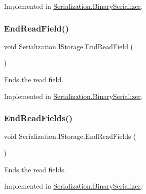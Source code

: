Implemented in \hyperlink{class_serialization_1_1_binary_serializer_a37b4e1255ab937e041a3c8d0786b461c}{Serialization.\+Binary\+Serializer}.

\mbox{\label{interface_serialization_1_1_i_storage_ad27a910b48b01fcee850465606cd2a6f}} 
\subsubsection{\texorpdfstring{End\+Read\+Field()}{EndReadField()}}
{\footnotesize\ttfamily void Serialization.\+I\+Storage.\+End\+Read\+Field (\begin{DoxyParamCaption}{ }\end{DoxyParamCaption})}



Ends the read field. 



Implemented in \hyperlink{class_serialization_1_1_binary_serializer_a0c52bbac20e29e59f6c48868d4729928}{Serialization.\+Binary\+Serializer}.

\mbox{\label{interface_serialization_1_1_i_storage_af38f83f1eb0c5190fd0e4ad845ff0649}} 
\subsubsection{\texorpdfstring{End\+Read\+Fields()}{EndReadFields()}}
{\footnotesize\ttfamily void Serialization.\+I\+Storage.\+End\+Read\+Fields (\begin{DoxyParamCaption}{ }\end{DoxyParamCaption})}



Ends the read fields. 



Implemented in \hyperlink{class_serialization_1_1_binary_serializer_a5083f578f8a2aff5fd5163edc802a0d1}{Serialization.\+Binary\+Serializer}.

\mbox{\label{interface_serialization_1_1_i_storage_a2349911c359017baa76773f203b33ee5}} 
